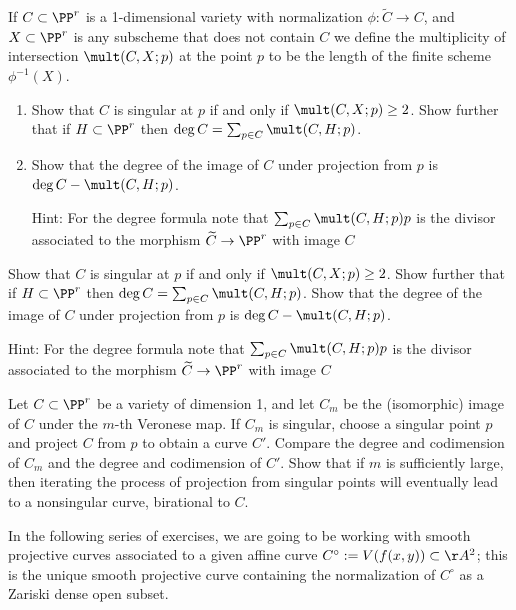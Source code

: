 \begin{exercise}
If $C\subset \PP^r$ is a 1-dimensional variety with normalization $\phi: \widetilde C\to C$, and $X\subset \PP^r$ is any subscheme that does
not contain $C$
we define the multiplicity of intersection $\mult(C,X;p)$ at the point $p$ to be the length of the finite scheme $\phi^{-1}(X)$.
\begin{enumerate}
\item Show that $C$ is singular at $p$ if and only if $\mult(C,X;p) \geq 2$. Show further that if $H\subset \PP^r$ then
 $\deg C = \sum_{p\in C} \mult(C,H;p)$. 
 \item Show that the degree of the image of $C$ under projection from $p$
 is $\deg C - \mult(C,H;p)$.
 
Hint: For the degree formula note that $\sum_{p\in C} \mult(C,H;p) p$ is the divisor associated to the morphism $\widetilde C \to \PP^r$ with image $C$
\end{enumerate}
 Show that $C$ is singular at $p$ if and only if $\mult(C,X;p) \geq 2$. Show further that if $H\subset \PP^r$ then
 $\deg C = \sum_{p\in C} \mult(C,H;p)$. Show that the degree of the image of $C$ under projection from $p$
 is $\deg C - \mult(C,H;p)$.
 
Hint: For the degree formula note that $\sum_{p\in C} \mult(C,H;p) p$ is the divisor associated to the morphism $\widetilde C \to \PP^r$ with image $C$
\end{exercise}

\begin{exercise}\label{resolution by projection}
Let $C\subset \PP^r$ be a variety of dimension 1, and let $C_m$ be the (isomorphic) image of $C$ under the $m$-th Veronese map.
If $C_m$ is singular, choose a singular point $p$ and project $C$ from $p$ to obtain a curve $C'$. Compare the degree and codimension of $C_m$ and the degree and codimension of $C'$. Show that if $m$ is sufficiently large, then iterating the process
of projection from singular points will eventually lead to a nonsingular curve, birational to $C$.
\end{exercise}

In the following series of exercises, we are going to be working with smooth projective curves associated to a given affine curve $C^\circ := V(f(x,y)) \subset \AA^2$; this is the unique smooth projective curve containing the normalization of $C^\circ$ as a Zariski dense open subset.

